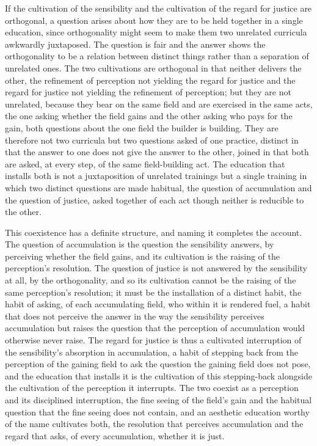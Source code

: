 If the cultivation of the sensibility and the cultivation of the regard for justice are orthogonal, a question arises about how they are to be held together in a single education, since orthogonality might seem to make them two unrelated curricula awkwardly juxtaposed. The question is fair and the answer shows the orthogonality to be a relation between distinct things rather than a separation of unrelated ones. The two cultivations are orthogonal in that neither delivers the other, the refinement of perception not yielding the regard for justice and the regard for justice not yielding the refinement of perception; but they are not unrelated, because they bear on the same field and are exercised in the same acts, the one asking whether the field gains and the other asking who pays for the gain, both questions about the one field the builder is building. They are therefore not two curricula but two questions asked of one practice, distinct in that the answer to one does not give the answer to the other, joined in that both are asked, at every step, of the same field-building act. The education that installs both is not a juxtaposition of unrelated trainings but a single training in which two distinct questions are made habitual, the question of accumulation and the question of justice, asked together of each act though neither is reducible to the other.

This coexistence has a definite structure, and naming it completes the account. The question of accumulation is the question the sensibility answers, by perceiving whether the field gains, and its cultivation is the raising of the perception's resolution. The question of justice is not answered by the sensibility at all, by the orthogonality, and so its cultivation cannot be the raising of the same perception's resolution; it must be the installation of a distinct habit, the habit of asking, of each accumulating field, who within it is rendered fuel, a habit that does not perceive the answer in the way the sensibility perceives accumulation but raises the question that the perception of accumulation would otherwise never raise. The regard for justice is thus a cultivated interruption of the sensibility's absorption in accumulation, a habit of stepping back from the perception of the gaining field to ask the question the gaining field does not pose, and the education that installs it is the cultivation of this stepping-back alongside the cultivation of the perception it interrupts. The two coexist as a perception and its disciplined interruption, the fine seeing of the field's gain and the habitual question that the fine seeing does not contain, and an aesthetic education worthy of the name cultivates both, the resolution that perceives accumulation and the regard that asks, of every accumulation, whether it is just.
